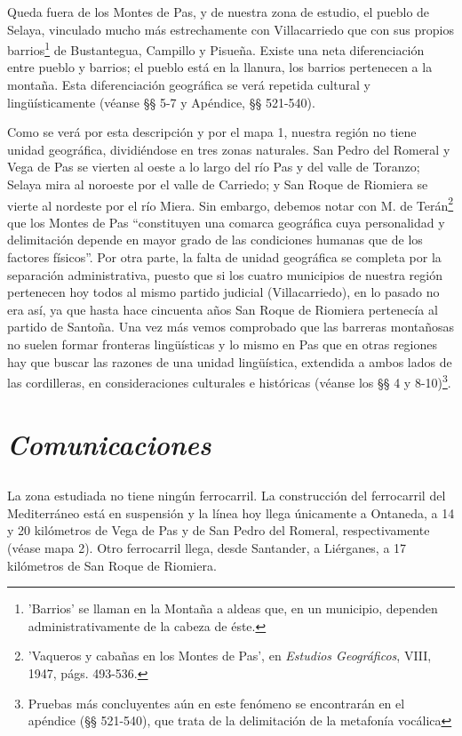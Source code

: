 \documentclass[11pt,spanish,b5paper]{book}
\begin{document}
Queda fuera de los Montes de Pas, y de nuestra zona de estudio, el pueblo de Selaya, vinculado mucho más estrechamente con Villacarriedo que con sus propios barrios\footnote{'Barrios' se llaman en la Montaña a aldeas que, en un municipio, dependen administrativamente de la cabeza de éste.} de Bustantegua, Campillo y Pisueña. Existe una neta diferenciación entre pueblo y barrios; el pueblo está en la llanura, los barrios pertenecen a la montaña. Esta diferenciación geográfica se verá repetida cultural y lingüísticamente (véanse §§ 5-7 y Apéndice, §§ 521-540). 

Como se verá por esta descripción y por el mapa 1, nuestra región no tiene unidad geográfica, dividiéndose en tres zonas naturales. San Pedro del Romeral y Vega de Pas se vierten al oeste a lo largo del río Pas y del valle de Toranzo; Selaya mira al noroeste por el valle de Carriedo; y San Roque de Riomiera se vierte al nordeste por el río Miera. Sin embargo, debemos notar con M. de Terán\footnote{'Vaqueros y cabañas en los Montes de Pas', en \emph{Estudios Geográficos}, VIII, 1947, págs. 493-536.} que los Montes de Pas ``constituyen una comarca geográfica cuya personalidad y delimitación depende en mayor grado de las condiciones humanas que de los factores físicos''. Por otra parte, la falta de unidad geográfica se completa por la separación administrativa, puesto que si los cuatro municipios de nuestra región pertenecen hoy todos al mismo partido judicial (Villacarriedo), en lo pasado no era así, ya que hasta hace cincuenta años San Roque de Riomiera pertenecía al partido de Santoña. Una vez más vemos comprobado que las barreras montañosas no suelen formar fronteras lingüísticas y lo mismo en Pas que en otras regiones hay que buscar las razones de una unidad lingüística, extendida a ambos lados de las cordilleras, en consideraciones culturales e históricas (véanse los §§ 4 y 8-10)\footnote{Pruebas más concluyentes aún en este fenómeno se encontrarán en el apéndice (§§ 521-540), que trata de la delimitación de la metafonía vocálica}.


\section{\emph{Comunicaciones}}
\subsection{} La zona estudiada no tiene ningún ferrocarril. La construcción del ferrocarril del Mediterráneo está en suspensión y la línea hoy llega únicamente a Ontaneda, a 14 y 20 kilómetros de Vega de Pas y de San Pedro del Romeral, respectivamente (véase mapa 2). Otro ferrocarril llega, desde Santander, a Liérganes, a 17 kilómetros de San Roque de Riomiera. 
\end{document}
